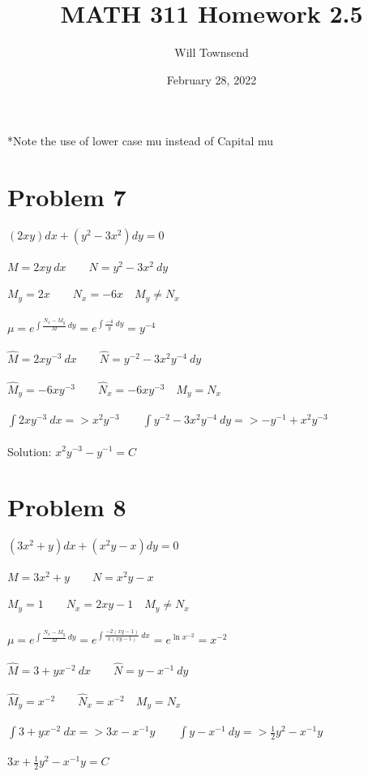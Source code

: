 \documentclass[12pt]{exam}
\title{\textbf{MATH 311 Homework 2.5}}
\author{Will Townsend}
\date{February 28, 2022}
\begin{document}
\maketitle
\begin{center}*Note the use of lower case mu instead of Capital mu\end{center}
\section*{Problem 7}
$(2xy)dx+(y^2-3x^2)dy=0$\\\\
$M=2xy\:dx\qquad N=y^2-3x^2\:dy$\\\\
$M_y=2x\qquad N_x=-6x\quad M_y\neq N_x$\\\\
$\mu=e^{\int\frac{N_x-M_y}{M}\:dy}=e^{\int\frac{-4}{y}\:dy}=y^{-4}$\\\\
$\hat{M}=2xy^{-3}\:dx\qquad \hat{N}=y^{-2}-3x^2y^{-4}\:dy$\\\\
$\hat{M}_y=-6xy^{-3}\qquad \hat{N}_x=-6xy^{-3}\quad M_y=N_x$\\\\
$\int2xy^{-3}\:dx=>x^2y^{-3}\qquad\int y^{-2}-3x^2y^{-4}\:dy=>-y^{-1}+x^2y^{-3}$\\\\
Solution: $x^2y^{-3}-y^{-1}=C$
\section*{Problem 8}
$(3x^2+y)dx+(x^2y-x)dy=0$\\\\
$M=3x^2+y\qquad N=x^2y-x$\\\\
$M_y=1\qquad N_x=2xy-1\quad M_y\neq N_x$\\\\
$\mu=e^{\int\frac{N_x-M_y}{M}\:dy}=e^{\int\frac{-2(xy-1)}{x(xy-1)}\:dx}=e^{\ln{x^{-2}}}=x^{-2}$\\\\
$\hat{M}=3+yx^{-2}\:dx\qquad \hat{N}=y-x^{-1}\:dy$\\\\
$\hat{M}_y=x^{-2}\qquad \hat{N}_x=x^{-2}\quad M_y=N_x$\\\\
$\int3+yx^{-2}\:dx=>3x-x^{-1}y\qquad\int y-x^{-1}\:dy=>\frac{1}{2}y^2-x^{-1}y$\\\\
$3x+\frac{1}{2}y^2-x^{-1}y=C$
\end{document}
